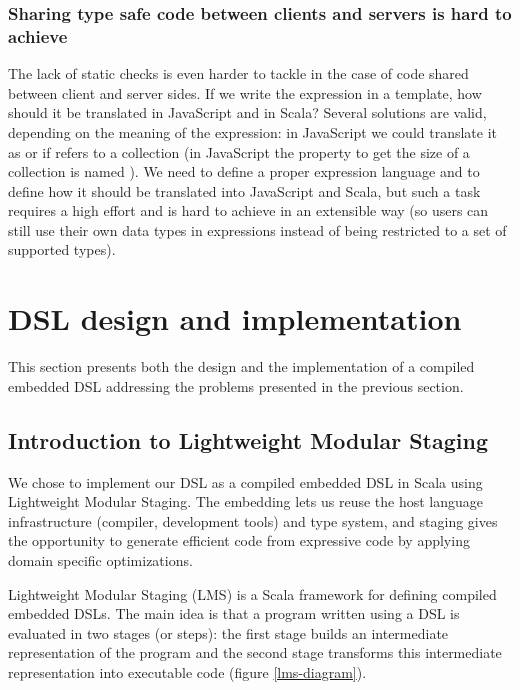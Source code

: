 \documentclass[american,english,runningheads]{llncs}
\begin{document}
\subsubsection{Sharing type safe code between clients and servers is hard to achieve}

The lack of static checks is even harder to tackle in the case of code shared between client and server sides. If we write the expression  in a template, how should it be translated in JavaScript and in Scala? Several solutions are valid, depending on the meaning of the expression: in JavaScript we could translate it as  or  if  refers to a collection (in JavaScript the property to get the size of a collection is named ). We need to define a proper expression language and to define how it should be translated into JavaScript and Scala, but such a task requires a high effort and is hard to achieve in an extensible way (so users can still use their own data types in expressions instead of being restricted to a set of supported types).

\section{DSL design and implementation}
\label{solution}

This section presents both the design and the implementation of a compiled embedded DSL addressing the problems presented in the previous section.

\subsection{Introduction to Lightweight Modular Staging}
\label{intro-lms}

We chose to implement our DSL as a compiled embedded DSL in Scala using Lightweight Modular Staging. The embedding lets us reuse the host language infrastructure (compiler, development tools) and type system, and staging gives the opportunity to generate efficient code from expressive code by applying domain specific optimizations.

Lightweight Modular Staging (LMS) is a Scala framework for defining compiled embedded DSLs. The main idea is that a program written using a DSL is evaluated in two stages (or steps): the first stage builds an intermediate representation of the program and the second stage transforms this intermediate representation into executable code (figure \ref{lms-diagram}).
\end{document}
